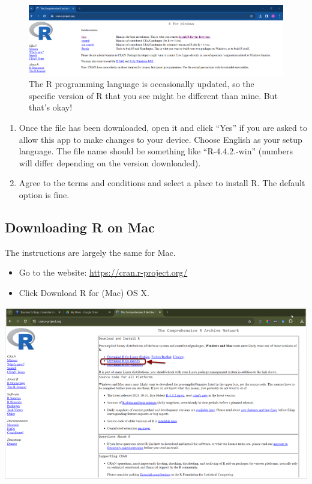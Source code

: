 \documentclass[
]{book}
\providecommand{\tightlist}{%
  \setlength{\itemsep}{0pt}\setlength{\parskip}{0pt}}
\begin{document}
\begin{figure}
\centering
\includegraphics{img/01-base.png}
\caption{\label{fig:unnamed-chunk-6}The R programming language is occasionally updated, so the specific version of R that you see might be different than mine. But that's okay!}
\end{figure}

\begin{enumerate}
\def\labelenumi{\arabic{enumi}.}
\setcounter{enumi}{4}
\tightlist
\item
  Once the file has been downloaded, open it and click ``Yes'' if you are asked to allow this app to make changes to your device. Choose English as your setup language. The file name should be something like ``R-4.4.2.-win'' (numbers will differ depending on the version downloaded).
\item
  Agree to the terms and conditions and select a place to install R. The default option is fine.
\end{enumerate}

\subsection{Downloading R on Mac}\label{downloading-r-on-mac}

The instructions are largely the same for Mac.

\begin{itemize}
\item
  Go to the website: \url{https://cran.r-project.org/}
\item
  Click Download R for (Mac) OS X.
\end{itemize}

\includegraphics{img/01-rstudiodownload-mac.png}
\end{document}
